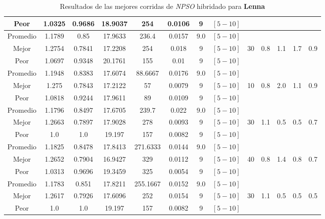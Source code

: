 \begin{table}[h!]
\begin{center}
\begin{tabular}{|c|c|c|c|c|c|c|c|c|c|c|c|c|}
            \cline{1-8}
            Peor & 1.0325 & 0.9686  & 18.9037 & 254 & 0.0106 & 9 & $[5-10]$ &  &  &  &  & \\
        \hline
        \hline
            Promedio  & 1.1789 & 0.85 & 17.9633 & 236.4 & 0.0157 & 9.0 & $[5-10]$ &  &  &  &  & \\
            \cline{1-8}
            Mejor & 1.2754 & 0.7841  & 17.2208 & 254 & 0.018 & 9 & $[5-10]$ & 30 & 0.8 & 1.1 & 1.7 & 0.9\\
            \cline{1-8}
            Peor & 1.0697 & 0.9348  & 20.1761 & 155 & 0.01 & 9 & $[5-10]$ &  &  &  &  & \\
        \hline
        \hline
            Promedio  & 1.1948 & 0.8383 & 17.6074 & 88.6667 & 0.0176 & 9.0 & $[5-10]$ &  &  &  &  & \\
            \cline{1-8}
            Mejor & 1.275 & 0.7843  & 17.2122 & 57 & 0.0079 & 9 & $[5-10]$ & 10 & 0.8 & 2.0 & 1.1 & 0.9\\
            \cline{1-8}
            Peor & 1.0818 & 0.9244  & 17.9611 & 89 & 0.0109 & 9 & $[5-10]$ &  &  &  &  & \\
        \hline
        \hline
            Promedio  & 1.1796 & 0.8497 & 17.6705 & 239.7 & 0.022 & 9.0 & $[5-10]$ &  &  &  &  & \\
            \cline{1-8}
            Mejor & 1.2663 & 0.7897  & 17.9028 & 278 & 0.0093 & 9 & $[5-10]$ & 30 & 1.1 & 0.5 & 0.5 & 0.7\\
            \cline{1-8}
            Peor & 1.0 & 1.0  & 19.197 & 157 & 0.0082 & 9 & $[5-10]$ &  &  &  &  & \\
        \hline
        \hline
            Promedio  & 1.1825 & 0.8478 & 17.8413 & 271.6333 & 0.0144 & 9.0 & $[5-10]$ &  &  &  &  & \\
            \cline{1-8}
            Mejor & 1.2652 & 0.7904  & 16.9427 & 329 & 0.0112 & 9 & $[5-10]$ & 40 & 0.8 & 1.4 & 0.8 & 0.7\\
            \cline{1-8}
            Peor & 1.0313 & 0.9696  & 19.3459 & 325 & 0.0054 & 9 & $[5-10]$ &  &  &  &  & \\
        \hline
        \hline
            Promedio  & 1.1783 & 0.851 & 17.8211 & 255.1667 & 0.0152 & 9.0 & $[5-10]$ &  &  &  &  & \\
            \cline{1-8}
            Mejor & 1.2617 & 0.7926  & 17.6096 & 252 & 0.0154 & 9 & $[5-10]$ & 30 & 1.1 & 0.5 & 0.5 & 0.5\\
            \cline{1-8}
            Peor & 1.0 & 1.0  & 19.197 & 157 & 0.0082 & 9 & $[5-10]$ &  &  &  &  & \\
        \hline
        \end{tabular}
        \caption{Resultados de las mejores corridas de \emph{NPSO} hibridado para {\bf Lenna}}
        \label{tb:tablepsohibimg}
    \end{center}
\end{table}


